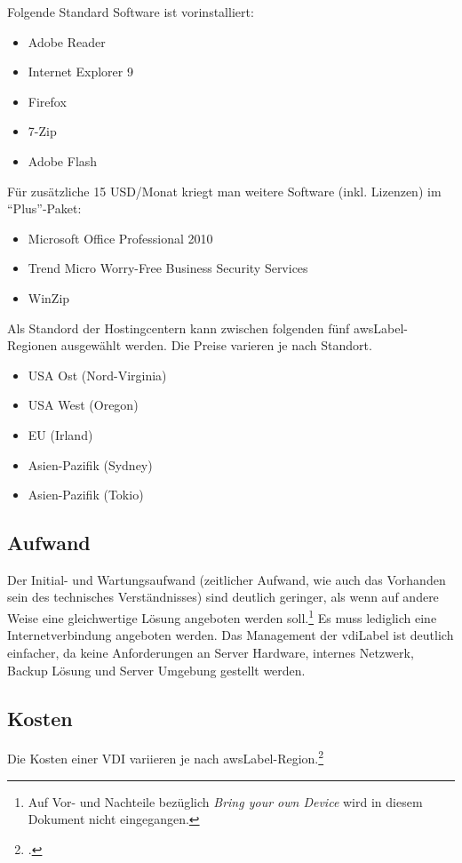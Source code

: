 Folgende Standard Software ist vorinstalliert:
\begin{itemize}
	\item Adobe Reader
	\item Internet Explorer 9
	\item Firefox
	\item 7-Zip
	\item Adobe Flash
\end{itemize}

Für zusätzliche 15 USD/Monat kriegt man weitere Software (inkl. Lizenzen) im "`Plus"'-Paket:
\begin{itemize}
	\item Microsoft Office Professional 2010
	\item Trend Micro Worry-Free Business Security Services
	\item WinZip
\end{itemize}

Als Standord der Hostingcentern kann zwischen folgenden fünf \Gls{awsLabel}-Regionen ausgewählt werden. Die Preise varieren je nach Standort.
\begin{itemize}
	\item USA Ost (Nord-Virginia)
	\item USA West (Oregon)
	\item EU (Irland)
	\item Asien-Pazifik (Sydney)
	\item Asien-Pazifik (Tokio)
\end{itemize}


\subsection{Aufwand}
Der Initial- und Wartungsaufwand (zeitlicher Aufwand, wie auch das Vorhanden sein des technisches Verständnisses) sind deutlich geringer, als wenn auf andere Weise eine gleichwertige Lösung angeboten werden soll.\footnote{Auf Vor- und Nachteile bezüglich \textit{Bring your own Device} wird in diesem Dokument nicht eingegangen.}
Es muss lediglich eine Internetverbindung angeboten werden.
Das Management der \Gls{vdiLabel} ist deutlich einfacher, da keine Anforderungen an Server Hardware, internes Netzwerk, Backup Lösung und Server Umgebung gestellt werden.


\subsection{Kosten}
Die Kosten einer VDI variieren je nach \Gls{awsLabel}-Region.\footcite{AWS_Amazon_WorkSpaces_Preise_2014-11-15}

